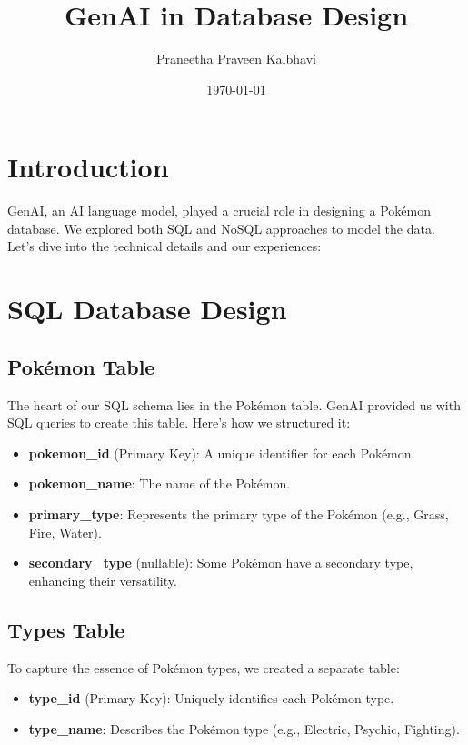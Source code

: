 \documentclass{article}
\title{GenAI in Database Design}
\author{Praneetha Praveen Kalbhavi}
\date{\today}
\begin{document}
\maketitle

\section{Introduction}
GenAI, an AI language model, played a crucial role in designing a Pokémon database. We explored both SQL and NoSQL approaches to model the data. Let's dive into the technical details and our experiences:

\section{SQL Database Design}

\subsection{Pokémon Table}
The heart of our SQL schema lies in the Pokémon table. GenAI provided us with SQL queries to create this table. Here's how we structured it:

\begin{itemize}
    \item \textbf{pokemon\_id} (Primary Key): A unique identifier for each Pokémon.
    \item \textbf{pokemon\_name}: The name of the Pokémon.
    \item \textbf{primary\_type}: Represents the primary type of the Pokémon (e.g., Grass, Fire, Water).
    \item \textbf{secondary\_type} (nullable): Some Pokémon have a secondary type, enhancing their versatility.
\end{itemize}

\subsection{Types Table}
To capture the essence of Pokémon types, we created a separate table:

\begin{itemize}
    \item \textbf{type\_id} (Primary Key): Uniquely identifies each Pokémon type.
    \item \textbf{type\_name}: Describes the Pokémon type (e.g., Electric, Psychic, Fighting).
\end{itemize}
\end{document}
